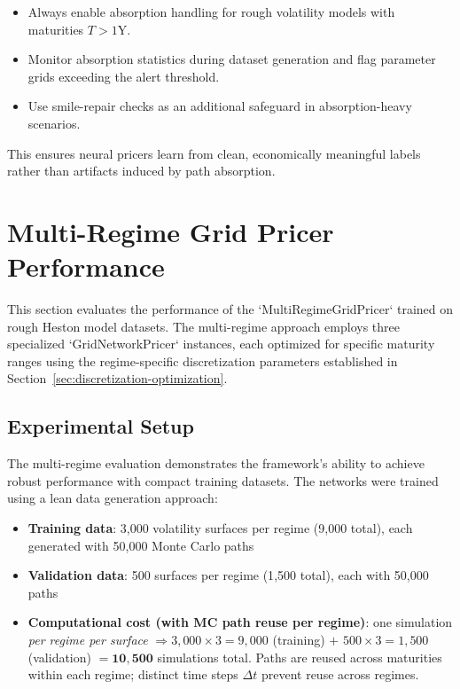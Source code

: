 	\begin{itemize}[nosep]
		\item Always enable absorption handling for rough volatility models with maturities $T>1$Y.
		\item Monitor absorption statistics during dataset generation and flag parameter grids exceeding the alert threshold.
		\item Use smile-repair checks as an additional safeguard in absorption-heavy scenarios.
	\end{itemize}
	
	This ensures neural pricers learn from clean, economically meaningful labels rather than artifacts induced by path absorption.
	
	\section{Multi-Regime Grid Pricer Performance}
	\label{sec:multiregime-results}
	
	This section evaluates the performance of the `MultiRegimeGridPricer` trained on rough Heston model datasets. The multi-regime approach employs three specialized `GridNetworkPricer` instances, each optimized for specific maturity ranges using the regime-specific discretization parameters established in Section~\ref{sec:discretization-optimization}.
	
	\subsection{Experimental Setup}
	
	The multi-regime evaluation demonstrates the framework's ability to achieve robust performance with compact training datasets. The networks were trained using a lean data generation approach:
	
	\begin{itemize}[nosep]
		\item \textbf{Training data}: 3{,}000 volatility surfaces per regime (9{,}000 total), each generated with 50{,}000 Monte Carlo paths
		\item \textbf{Validation data}: 500 surfaces per regime (1{,}500 total), each with 50{,}000 paths
		\item \textbf{Computational cost (with MC path reuse per regime)}: 
		one simulation \emph{per regime per surface} 
		$\Rightarrow 3{,}000 \times 3 = 9{,}000$ (training) $+$ 
		$500 \times 3 = 1{,}500$ (validation) 
		$= \mathbf{10{,}500}$ simulations total. 
		Paths are reused across maturities within each regime; distinct time steps $\Delta t$ prevent reuse across regimes.
	\end{itemize}
	
